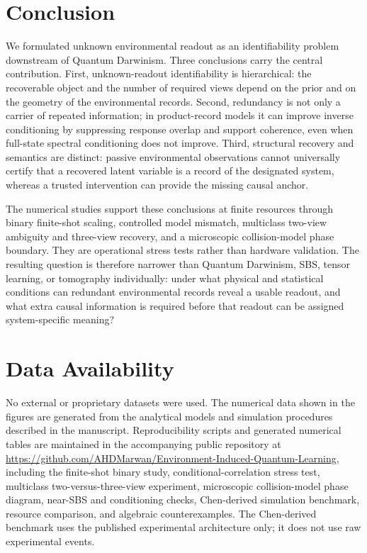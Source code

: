 \section{Conclusion}

We formulated unknown environmental readout as an identifiability problem downstream of Quantum Darwinism.  Three conclusions carry the central contribution.  First, unknown-readout identifiability is hierarchical: the recoverable object and the number of required views depend on the prior and on the geometry of the environmental records.  Second, redundancy is not only a carrier of repeated information; in product-record models it can improve inverse conditioning by suppressing response overlap and support coherence, even when full-state spectral conditioning does not improve.  Third, structural recovery and semantics are distinct: passive environmental observations cannot universally certify that a recovered latent variable is a record of the designated system, whereas a trusted intervention can provide the missing causal anchor.

The numerical studies support these conclusions at finite resources through binary finite-shot scaling, controlled model mismatch, multiclass two-view ambiguity and three-view recovery, and a microscopic collision-model phase boundary.  They are operational stress tests rather than hardware validation.  The resulting question is therefore narrower than Quantum Darwinism, SBS, tensor learning, or tomography individually: under what physical and statistical conditions can redundant environmental records reveal a usable readout, and what extra causal information is required before that readout can be assigned system-specific meaning?

\section*{Data Availability}
No external or proprietary datasets were used.  The numerical data shown in the figures are generated from the analytical models and simulation procedures described in the manuscript.  Reproducibility scripts and generated numerical tables are maintained in the accompanying public repository at \url{https://github.com/AHDMarwan/Environment-Induced-Quantum-Learning}, including the finite-shot binary study, conditional-correlation stress test, multiclass two-versus-three-view experiment, microscopic collision-model phase diagram, near-SBS and conditioning checks, Chen-derived simulation benchmark, resource comparison, and algebraic counterexamples.  The Chen-derived benchmark uses the published experimental architecture only; it does not use raw experimental events.


